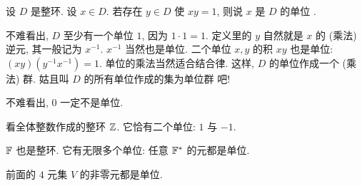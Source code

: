 \subsubsection*{\UnitsAndFields}

\begin{definition}
    设 $D$ 是整环. 设 $x \in D$. 若存在 $y \in D$ 使 $xy=1$, 则说 $x$ 是 $D$ 的单位 .
\end{definition}

\begin{remark}
    不难看出, $D$ 至少有一个单位 $1$, 因为 $1 \cdot 1 = 1$. 定义里的 $y$ 自然就是 $x$ 的 (乘法) 逆元, 其一般记为 $x^{-1}$. $x^{-1}$ 当然也是单位. 二个单位 $x,y$ 的积 $xy$ 也是单位: $(xy)(y^{-1}x^{-1})=1$. 单位的乘法当然适合结合律. 这样, $D$ 的单位作成一个 (乘法) 群. 姑且叫 $D$ 的所有单位作成的集为单位群  吧!
\end{remark}

\begin{remark}
    不难看出, $0$ 一定不是单位.
\end{remark}

\begin{example}
    看全体整数作成的整环 $\mathbb{Z}$. 它恰有二个单位: $1$ 与 $-1$.
\end{example}

\begin{example}
    $\mathbb{F}$ 也是整环. 它有无限多个单位: 任意 $\mathbb{F}^{\ast}$ 的元都是单位.
\end{example}

\begin{example}
    前面的 $4$ 元集 $V$ 的非零元都是单位.
\end{example}

